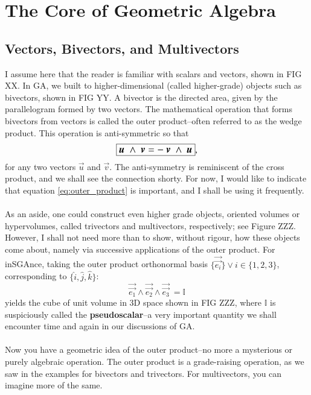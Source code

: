 
\section{The Core of Geometric Algebra}
\subsection{Vectors, Bivectors, and Multivectors}

I assume here that the reader is familiar with scalars and vectors, shown in FIG XX. In GA, we built to higher-dimensional (called higher-grade) objects such as bivectors, shown in FIG YY. A bivector is the directed area, given by the parallelogram formed by two vectors. The mathematical operation that forms bivectors from vectors is called the outer product--often referred to as the wedge product. This operation is anti-symmetric so that 
\begin{equation} \label{eq:outer_product}
    \large\boxed{\vec{u} \ \wedge \ \vec{v} = - \ \vec{v} \ \wedge \ \vec{u} },
\end{equation}
for any two vectors $\vec{u}$ and $\vec{v}$. The anti-symmetry is reminiscent of the cross product, and we shall see the connection shorty. For now, I would like to indicate that equation \ref{eq:outer_product} is important, and I shall be using it frequently. 
\\ \\
As an aside, one could construct even higher grade objects, oriented volumes or hypervolumes, called trivectors and multivectors, respectively; see Figure ZZZ. However, I shall not need more than to show, without rigour, how these objects come about, namely via successive applications of the outer product. For inSGAnce, taking the outer product orthonormal basis $\{ \vec{\vec{e_i}} \} \vee i \in \{ 1, 2,3\} $, corresponding to $ \{ \hat{i}, \hat{j}, \hat{k} \}$:
\begin{equation} \label{eq:pseudoscalar_wedge_definition}
   \vec{\vec{e_1}} \wedge \vec{\vec{e_2}} \wedge \vec{\vec{e_3}} \ = \mathbb{I}  
\end{equation}
yields the cube of unit volume in 3D space shown in FIG ZZZ, where $\mathbb{I}$ is suspiciously called the \textbf{pseudoscalar}--a very important quantity we shall encounter time and again in our discussions of GA.
\\ \\
Now you have a geometric idea of the outer product--no more a mysterious or purely algebraic operation. The outer product is a grade-raising operation, as we saw in the examples for bivectors and trivectors. For multivectors, you can imagine more of the same.

